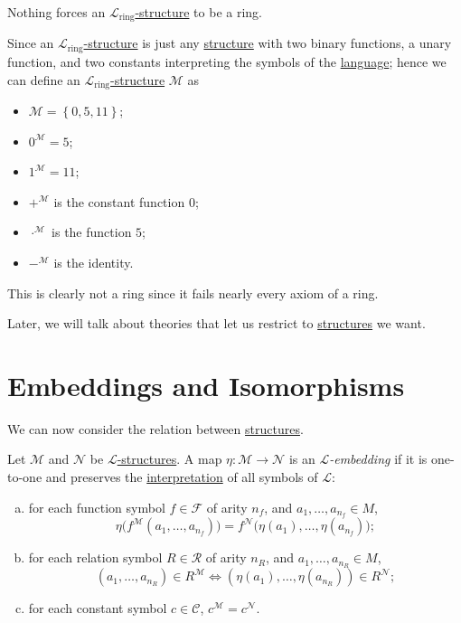 \begin{eg}
	Nothing forces an \hyperref[def:structure]{\(\mathcal{L} _{\text{ring} }\)-structure} to be a ring.
\end{eg}
\begin{explanation}
	Since an \hyperref[def:structure]{\(\mathcal{L} _{\text{ring} }\)-structure} is just any \hyperref[def:structure]{structure} with two binary functions, a unary function, and two constants interpreting the symbols of the \hyperref[def:language]{language}; hence we can define an \hyperref[def:structure]{\(\mathcal{L} _{\text{ring} }\)-structure} \(\mathcal{M} \) as
	\begin{itemize}
		\item \(\mathcal{M} = \left\{ 0, 5, 11 \right\} \);
		\item \(0^{\mathcal{M} } = 5\);
		\item \(1^{\mathcal{M} } = 11\);
		\item \(+^{\mathcal{M} } \) is the constant function \(0\);
		\item \(\cdot^{\mathcal{M} }\) is the function \(5\);
		\item \(-^{\mathcal{M} }\) is the identity.
	\end{itemize}
	This is clearly not a ring since it fails nearly every axiom of a ring.
\end{explanation}

\begin{note}
	Later, we will talk about theories that let us restrict to \hyperref[def:structure]{structures} we want.
\end{note}

\section{Embeddings and Isomorphisms}
We can now consider the relation between \hyperref[def:structure]{structures}.

\begin{definition}[Embedding]\label{def:embedding}
	Let \(\mathcal{M} \) and \(\mathcal{N} \) be \hyperref[def:structure]{\(\mathcal{L} \)-structures}. A map \(\eta \colon \mathcal{M}  \to \mathcal{N} \) is an \emph{\(\mathcal{L} \)-embedding} if it is one-to-one and preserves the \hyperref[not:interpretation]{interpretation} of all symbols of \(\mathcal{L} \):
	\begin{enumerate}[(a)]
		\item for each function symbol \(f\in \mathcal{F} \) of arity \(n_f\), and \(a_1, \dots , a_{n_f}\in M \),
		      \[
			      \eta \big(f^{\mathcal{M} }(a_1, \dots , a_{n_f})\big) = f^{\mathcal{N}} \big( \eta (a_1), \dots , \eta (a_{n_f})\big);
		      \]
		      \item\label{def:embedding-relation} for each relation symbol \(R\in \mathcal{R} \) of arity \(n_R\), and \(a_1, \dots , a_{n_R}\in M\),
		      \[
			      (a_1, \dots , a_{n_R})\in R^{\mathcal{M} } \iff (\eta (a_1), \dots , \eta (a_{n_R})) \in R^{\mathcal{N} };
		      \]
		\item for each constant symbol \(c\in \mathcal{C} \), \(c^{\mathcal{M} } = c^{\mathcal{N} }\).
	\end{enumerate}
\end{definition}

